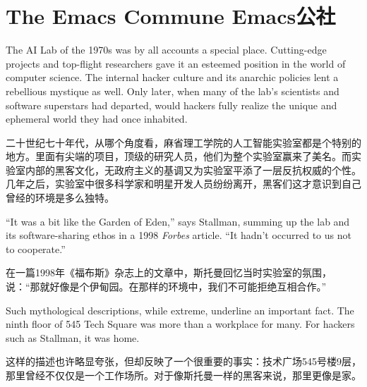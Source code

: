 \chapter{\ifdefined\eng
The Emacs Commune
\fi
\ifdefined\chs
Emacs公社
\fi
}

\ifdefined\eng
The AI Lab of the 1970s was by all accounts a special place. Cutting-edge projects and top-flight researchers gave it an esteemed position in the world of computer science. The internal hacker culture and its anarchic policies lent a rebellious mystique as well. Only later, when many of the lab's scientists and software superstars had departed, would hackers fully realize the unique and ephemeral world they had once inhabited.
\fi

\ifdefined\chs
二十世纪七十年代，从哪个角度看，麻省理工学院的人工智能实验室都是个特别的地方。里面有尖端的项目，顶级的研究人员，他们为整个实验室赢来了美名。而实验室内部的黑客文化，无政府主义的基调又为实验室平添了一层反抗权威的个性。几年之后，实验室中很多科学家和明星开发人员纷纷离开，黑客们这才意识到自己曾经的环境是多么独特。
\fi

\ifdefined\eng
``It was a bit like the Garden of Eden,'' says Stallman, summing up the lab and its software-sharing ethos in a 1998 \textit{Forbes} article. ``It hadn't occurred to us not to cooperate.''
\fi

\ifdefined\chs
在一篇1998年《福布斯》杂志上的文章中，斯托曼回忆当时实验室的氛围，说：``那就好像是个伊甸园。在那样的环境中，我们不可能拒绝互相合作。''
\fi

\ifdefined\eng
Such mythological descriptions, while extreme, underline an important fact. The ninth floor of 545 Tech Square was more than a workplace for many. For hackers such as Stallman, it was home.
\fi

\ifdefined\chs
这样的描述也许略显夸张，但却反映了一个很重要的事实：技术广场545号楼9层，那里曾经不仅仅是一个工作场所。对于像斯托曼一样的黑客来说，那里更像是家。
\fi

